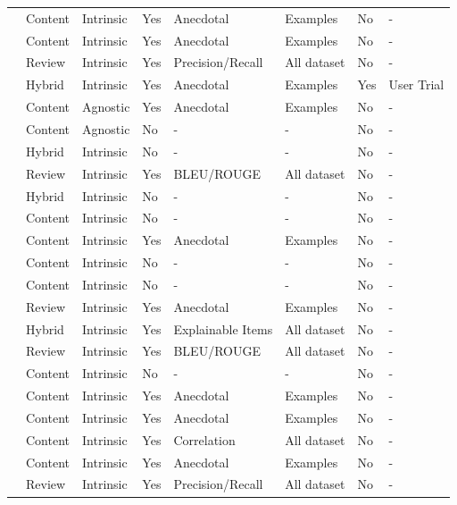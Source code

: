 \begin{tabular}{llllllll}
\cite{TAO2022109300} & Content & Intrinsic & Yes & Anecdotal & Examples & No & - \\
\cite{TAO2021107217} & Content & Intrinsic & Yes & Anecdotal & Examples & No & - \\
\cite{YANG2021106687} & Review & Intrinsic & Yes & Precision/Recall & All dataset & No & - \\
\cite{LIU2020102099} & Hybrid & Intrinsic & Yes & Anecdotal & Examples & Yes & User Trial \\
\cite{LIANG202194} & Content & Agnostic & Yes & Anecdotal & Examples & No & - \\
\cite{ZANON2022109333} & Content & Agnostic & No & - & - & No & - \\
\cite{PAZRUZA2024102497} & Hybrid & Intrinsic & No & - & - & No & - \\
\cite{AI2025129692} & Review & Intrinsic & Yes & BLEU/ROUGE & All dataset & No & - \\
\cite{WEI2023202} & Hybrid & Intrinsic & No & - & - & No & - \\
\cite{KAUR2023100507} & Content & Intrinsic & No & - & - & No & - \\
\cite{YANG2020106194} & Content & Intrinsic & Yes & Anecdotal & Examples & No & - \\
\cite{LI2024112042} & Content & Intrinsic & No & - & - & No & - \\
\cite{WANG2020436} & Content & Intrinsic & No & - & - & No & - \\
\cite{GUO2021185} & Review & Intrinsic & Yes & Anecdotal & Examples & No & - \\
\cite{MARKCHOM2023110258} & Hybrid & Intrinsic & Yes & Explainable Items & All dataset & No & - \\
\cite{HAO2025113113} & Review & Intrinsic & Yes & BLEU/ROUGE & All dataset & No & - \\
\cite{LIU2025113217} & Content & Intrinsic & No & - & - & No & - \\
\cite{WU2025129780} & Content & Intrinsic & Yes & Anecdotal & Examples & No & - \\
\cite{10.1145/3269206.3271739} & Content & Intrinsic & Yes & Anecdotal & Examples & No & - \\
\cite{10.1145/3357384.3357925} & Content & Intrinsic & Yes & Correlation & All dataset & No & - \\
\cite{10.1145/3219819.3219965} & Content & Intrinsic & Yes & Anecdotal & Examples & No & - \\
\cite{10.1145/3178876.3186070} & Review & Intrinsic & Yes & Precision/Recall & All dataset & No & - \\

\end{tabular}
